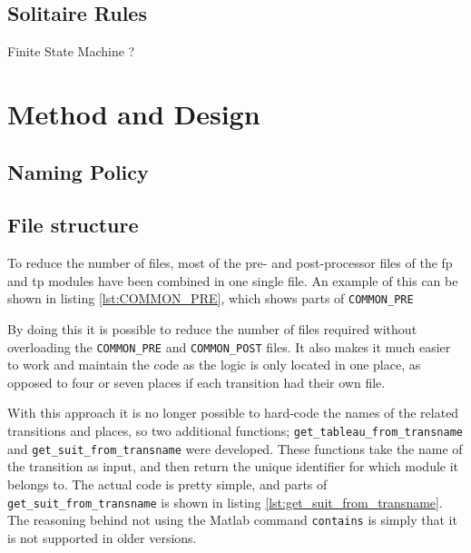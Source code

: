\documentclass[runningheads,a4paper]{llncs}
\newcommand{\GPenSIM}{../GPenSIM}
\begin{document}
\subsection{Solitaire Rules}


Finite State Machine ?


\section{Method and Design}
\label{sec:2_method_and_design}
\subsection{Naming Policy}
\subsection{File structure}
To reduce the number of files, most of the pre- and post-processor files of the \ac{fp} and \ac{tp} modules have been combined in one single file. An example of this can be shown in listing \ref{lst:COMMON_PRE}, which shows parts of \verb!COMMON_PRE!


By doing this it is possible to reduce the number of files required without overloading the \verb!COMMON_PRE! and \verb!COMMON_POST! files. It also makes it much easier to work and maintain the code as the logic is only located in one place, as opposed to four or seven places if each transition had their own file.
\newline

With this approach it is no longer possible to hard-code the names of the related transitions and places, so two additional functions; \verb!get_tableau_from_transname! and \verb!get_suit_from_transname! were developed. These functions take the name of the transition as input, and then return the unique identifier for which module it belongs to. The actual code is pretty simple, and parts of \verb!get_suit_from_transname! is shown in listing \ref{lst:get_suit_from_transname}. The reasoning behind not using the Matlab command \verb!contains! is simply that it is not supported in older versions.

\end{document}
